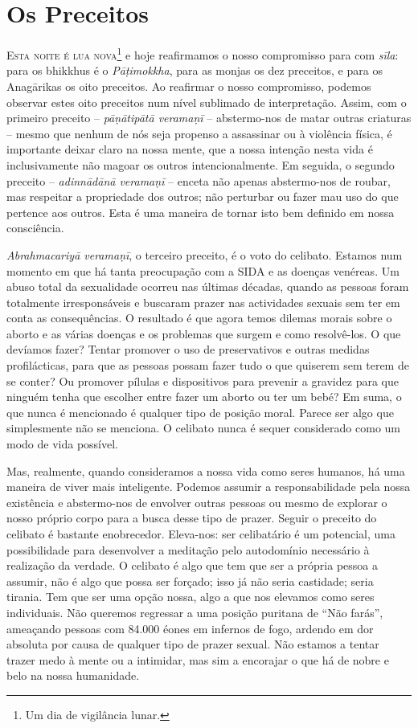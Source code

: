 \chapter{Os Preceitos}

\lettrine{E}{sta noite é lua nova}\footnote{Um dia de vigilância lunar.} e hoje reafirmamos o
nosso compromisso para com \emph{sīla}: para os bhikkhus é o \emph{Pāṭimokkha}, para as
monjas os dez preceitos, e para os Anagārikas os oito preceitos. Ao reafirmar o
nosso compromisso, podemos observar estes oito preceitos num nível sublimado de
interpretação. Assim, com o primeiro preceito -- \emph{pāṇātipātā veramaṇī} --
abstermo-nos de matar outras criaturas -- mesmo que nenhum de nós seja propenso
a assassinar ou à violência física, é importante deixar claro na nossa mente,
que a nossa intenção nesta vida é inclusivamente não magoar os outros
intencionalmente. Em seguida, o segundo preceito -- \emph{adinnādānā veramaṇī}
-- enceta não apenas abstermo-nos de roubar, mas respeitar a propriedade dos
outros; não perturbar ou fazer mau uso do que pertence aos outros. Esta é uma
maneira de tornar isto bem definido em nossa consciência.

\emph{Abrahmacariyā veramaṇī}, o terceiro preceito, é o voto do celibato.
Estamos num momento em que há tanta preocupação com a SIDA e as doenças
venéreas. Um abuso total da sexualidade ocorreu nas últimas décadas, quando as
pessoas foram totalmente irresponsáveis e buscaram prazer nas actividades
sexuais sem ter em conta as consequências. O resultado é que agora temos dilemas
morais sobre o aborto e as várias doenças e os problemas que surgem e como
resolvê-los. O que devíamos fazer? Tentar promover o uso de preservativos e
outras medidas profilácticas, para que as pessoas possam fazer tudo o que
quiserem sem terem de se conter? Ou promover pílulas e dispositivos para
prevenir a gravidez para que ninguém tenha que escolher entre fazer um aborto ou
ter um bebé? Em suma, o que nunca é mencionado é qualquer tipo de posição moral.
Parece ser algo que simplesmente não se menciona. O celibato nunca é sequer
considerado como um modo de vida possível.

Mas, realmente, quando consideramos a nossa vida como seres humanos, há uma
maneira de viver mais inteligente. Podemos assumir a responsabilidade pela nossa
existência e abstermo-nos de envolver outras pessoas ou mesmo de explorar o
nosso próprio corpo para a busca desse tipo de prazer. Seguir o preceito do
celibato é bastante enobrecedor. Eleva-nos: ser celibatário é um potencial, uma
possibilidade para desenvolver a meditação pelo autodomínio necessário à
realização da verdade. O celibato é algo que tem que ser a própria pessoa a
assumir, não é algo que possa ser forçado; isso já não seria castidade; seria
tirania. Tem que ser uma opção nossa, algo a que nos elevamos como seres
individuais. Não queremos regressar a uma posição puritana de ``Não farás'',
ameaçando pessoas com 84.000 éones em infernos de fogo, ardendo em dor absoluta
por causa de qualquer tipo de prazer sexual. Não estamos a tentar trazer medo à
mente ou a intimidar, mas sim a encorajar o que há de nobre e belo na nossa
humanidade.


